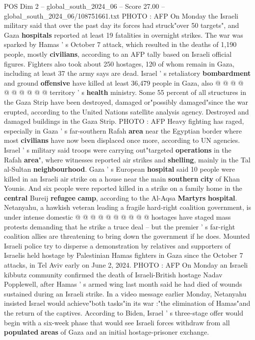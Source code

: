 \begin{textsample}{POS Dim 2 – global\_south\_2024\_06 – Score 27.00 – global\_south\_2024\_06/108751661.txt}
PHOTO : AFP On Monday the Israeli military said that over the past day its forces had struck"over 50 targets", and Gaza \textbf{hospitals} reported at least 19 fatalities in overnight strikes.
The war was sparked by Hamas ' s October 7 attack, which resulted in the deaths of 1,190 people, mostly \textbf{civilians}, according to an AFP tally based on Israeli official figures.
Fighters also took about 250 hostages, 120 of whom remain in Gaza, including at least 37 the army says are dead.
Israel ' s retaliatory \textbf{bombardment} and ground \textbf{offensive} have killed at least 36,479 people in Gaza, also @ @ @ @ @ @ @ @ @ @ territory ' s \textbf{health} ministry.
Some 55 percent of all structures in the Gaza Strip have been destroyed, damaged or"possibly damaged"since the war erupted, according to the United Nations satellite analysis agency.
Destroyed and damaged buildings in the Gaza Strip.
PHOTO : AFP Heavy fighting has raged, especially in Gaza ' s far-southern Rafah \textbf{area} near the Egyptian border where most \textbf{civilians} have now been displaced once more, according to UN agencies.
Israel ' s military said troops were carrying out"targeted \textbf{operations} in the Rafah \textbf{area}", where witnesses reported air strikes and \textbf{shelling}, mainly in the Tal al-Sultan \textbf{neighbourhood}.
Gaza ' s European \textbf{hospital} said 10 people were killed in an Israeli air strike on a house near the main \textbf{southern} \textbf{city} of Khan Younis.
And six people were reported killed in a strike on a family home in the \textbf{central} Bureij \textbf{refugee} \textbf{camp}, according to the Al-Aqsa \textbf{Martyrs} \textbf{hospital}.
Netanyahu, a hawkish veteran leading a fragile hard-right coalition government, is under intense domestic @ @ @ @ @ @ @ @ @ @ hostages have staged mass protests demanding that he strike a truce deal -- but the premier ' s far-right coalition allies are threatening to bring down the government if he does.
Mounted Israeli police try to disperse a demonstration by relatives and supporters of Israelis held hostage by Palestinian Hamas fighters in Gaza since the October 7 attacks, in Tel Aviv early on June 2, 2024.
PHOTO : AFP On Monday an Israeli kibbutz community confirmed the death of Israeli-British hostage Nadav Popplewell, after Hamas ' s armed wing last month said he had died of wounds sustained during an Israeli strike.
In a video message earlier Monday, Netanyahu insisted Israel would achieve"both tasks"in its war :"the elimination of Hamas"and the return of the captives.
According to Biden, Israel ' s three-stage offer would begin with a six-week phase that would see Israeli forces withdraw from all \textbf{populated} \textbf{areas} of Gaza and an initial hostage-prisoner exchange.

\end{textsample}
